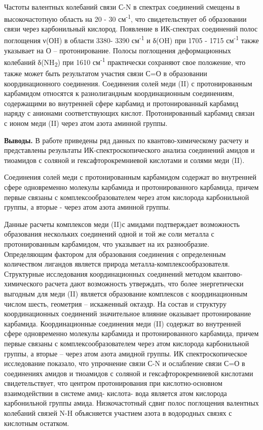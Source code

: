 \begin{multicols}{2}
Частоты валентных колебаний связи С-N в спектрах соединений смещены в
высокочастотную область на 20 - 30 см\textsuperscript{-1}, что
свидетельствует об образовании связи через карбонильный кислород.
Появление в ИК-спектрах соединений полос поглощения ν(ОH) в области
3380- 3390 см\textsuperscript{-1} и δ(OH) при 1705 - 1715
см\textsuperscript{-1} также указывает на О -- протонирование. Полосы
поглощения деформационных колебаний δ(NH\textsubscript{2}) при 1610
см\textsuperscript{-1} практически сохраняют свое положение, что также
может быть результатом участия связи С=О в образовании координационного
соединения. Соединения солей меди (II) с протонированным карбамидом
относятся к разнолигандным координационным соединениям, содержащими во
внутренней сфере карбамид и протонированный карбамид наряду с анионами
соответствующих кислот. Протонированный карбамид связан с ионом меди
(II) через атом азота аминной группы.

{\bfseries Выводы.} В работе приведены ряд данных по квантово-химическому
расчету и представлены результаты ИК-спектроскопического анализа
соединений амидов и тиоамидов с соляной и гексафторокремниевой кислотами
и солями меди (II).

Соединения солей меди с протонированным карбамидом содержат во
внутренней сфере одновременно молекулы карбамида и протонированного
карбамида, причем первые связаны с комплексообразователем через атом
кислорода карбонильной группы, а вторые - через атом азота аминной
группы.

Данные расчеты комплексов меди (II)с амидами подтверждает возможность
образования нескольких соединений одной и той же соли металла с
протонированным карбамидом, что указывает на их разнообразие.
Определяющим фактором для образования соединения с определенным
количеством лигандов является природа металла-комплексообразователя.
Структурные исследования координационных соединений методом
квантово-химического расчета дают возможность утверждать, что более
энергетически выгодным для меди (II) является образование комплексов с
координационным числом шесть, геометрия -- искаженный октаэдр. На состав
и структуру координационных соединений значительное влияние оказывает
протонирование карбамида. Координационные соединения меди (II) содержат
во внутренней сфере одновременно молекулы карбамида и протонированного
карбамида, причем первые связаны с комплексообразователем через атом
кислорода карбонильной группы, а вторые -- через атом азота амидной
группы. ИК спектроскопическое исследование показало, что упрочнение
связи С-N и ослабление связи С=О в соединениях амидов и тиоамидов с
соляной и гексафторокремниевой кислотами свидетельствует, что центром
протонирования при кислотно-основном взаимодействии в системе амид-
кислота- вода является атом кислорода карбонильной группы амида.
Низкочастотный сдвиг полос поглощения валентных колебаний связей N-H
объясняется участием азота в водородных связях с кислотным остатком.


\end{multicols}

